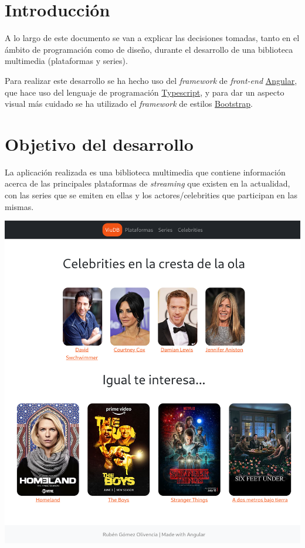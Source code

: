 \documentclass{\ClassPath/viu-tfm-template}
\begin{document}
    \graphicspath{{../../VIU_TFM_LaTeX_template/}}

    \coverpage

    \tableofcontents

\chapter{Introducción}

A lo largo de este documento se van a explicar las decisiones tomadas, tanto en el ámbito de programación como de diseño, durante el desarrollo de una biblioteca multimedia (plataformas y series).

Para realizar este desarrollo se ha hecho uso del \textit{framework} de \textit{front-end} \href{https://angular.io/}{Angular}, que hace uso del lenguaje de programación \href{https://www.typescriptlang.org/}{Typescript}, y para dar un aspecto visual más cuidado se ha utilizado el \textit{framework} de estilos \href{https://getbootstrap.com/}{Bootstrap}.

\chapter{Objetivo del desarrollo}

La aplicación realizada es una biblioteca multimedia que contiene información acerca de las principales plataformas de \textit{streaming} que existen en la actualidad, con las series que se emiten en ellas y los actores/celebrities que participan en las mismas.

\vspace{-1.2em}
\begin{center}
    \includegraphics[frame,width=0.58\linewidth]{img/inicio.png}
\end{center}
\vspace{-1.2em}
\end{document}
